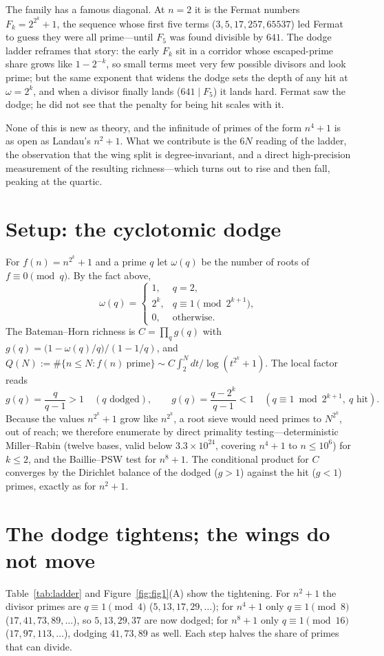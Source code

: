 \documentclass[11pt]{article}
\theoremstyle{definition}
\begin{document}
The family has a famous diagonal. At $n=2$ it is the Fermat numbers $F_k=2^{2^k}+1$, the sequence
whose first five terms ($3,5,17,257,65537$) led Fermat to guess they were all prime---until $F_5$ was
found divisible by $641$. The dodge ladder reframes that story: the early $F_k$ sit in a corridor whose
escaped-prime share grows like $1-2^{-k}$, so small terms meet very few possible divisors and look
prime; but the same exponent that widens the dodge sets the depth of any hit at $\omega=2^k$, and when
a divisor finally lands ($641\mid F_5$) it lands hard. Fermat saw the dodge; he did not see that the
penalty for being hit scales with it.

None of this is new as theory, and the infinitude of primes of the form $n^4+1$ is as open as Landau's
$n^2+1$. What we contribute is the $6N$ reading of the ladder, the observation that the wing split is
degree-invariant, and a direct high-precision measurement of the resulting richness---which turns out
to rise and then fall, peaking at the quartic.

\section{Setup: the cyclotomic dodge}
For $f(n)=n^{2^k}+1$ and a prime $q$ let $\omega(q)$ be the number of roots of $f\equiv0\pmod q$. By the
fact above,
\[
\omega(q)=\begin{cases}1,& q=2,\\ 2^k,& q\equiv1\pmod{2^{k+1}},\\ 0,& \text{otherwise.}\end{cases}
\]
The Bateman--Horn richness is $C=\prod_q g(q)$ with $g(q)=\bigl(1-\omega(q)/q\bigr)/(1-1/q)$, and
$Q(N):=\#\{n\le N:f(n)\ \text{prime}\}\sim C\int_2^N dt/\log(t^{2^k}+1)$. The local factor reads
\[
g(q)=\frac{q}{q-1}>1\quad(\text{$q$ dodged}),\qquad
g(q)=\frac{q-2^k}{q-1}<1\quad(q\equiv1\bmod2^{k+1},\ \text{$q$ hit}).
\]
Because the values $n^{2^k}+1$ grow like $n^{2^k}$, a root sieve would need primes to $N^{2^k}$, out of
reach; we therefore enumerate by direct primality testing---deterministic Miller--Rabin (twelve bases,
valid below $3.3\times10^{24}$, covering $n^4+1$ to $n\le10^{6}$) for $k\le2$, and the
Baillie--PSW test for $n^8+1$. The conditional product for $C$ converges by the Dirichlet balance of the
dodged ($g>1$) against the hit ($g<1$) primes, exactly as for $n^2+1$.

\section{The dodge tightens; the wings do not move}
Table~\ref{tab:ladder} and Figure~\ref{fig:fig1}(A) show the tightening. For $n^2+1$ the divisor primes
are $q\equiv1\pmod4$ ($5,13,17,29,\dots$); for $n^4+1$ only $q\equiv1\pmod8$ ($17,41,73,89,\dots$), so
$5,13,29,37$ are now dodged; for $n^8+1$ only $q\equiv1\pmod{16}$ ($17,97,113,\dots$), dodging
$41,73,89$ as well. Each step halves the share of primes that can divide.
\end{document}
